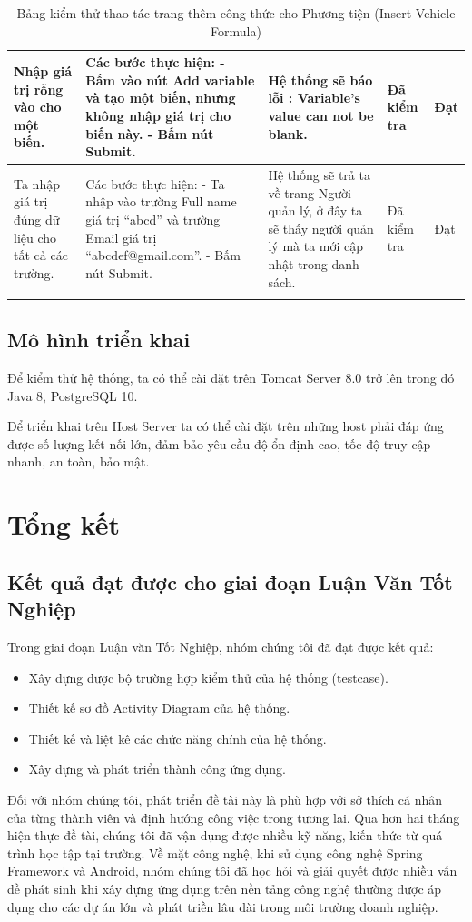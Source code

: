 \documentclass{article}
\begin{document}
\begin{longtable}{ | p{} |p{} | p{}  | p{}  | p{}  | }
\hline
Nhập giá trị rỗng vào cho một biến. &
Các bước thực hiện: \newline
- Bấm vào nút Add variable và tạo một biến, nhưng không nhập giá trị cho biến này. \newline
- Bấm nút Submit.  
&
Hệ thống sẽ báo lỗi : Variable's value can not be blank.
&
Đã kiểm tra &
Đạt \\

\hline
Ta nhập giá trị đúng dữ liệu cho tất cả các trường. &
Các bước thực hiện: \newline
- Ta nhập vào trường Full name giá trị “abcd” và trường Email giá trị “abcdef@gmail.com”. \newline
- Bấm nút Submit.  
&
Hệ thống sẽ trả ta về trang Người quản lý, ở đây ta sẽ thấy người quản lý mà ta mới cập nhật trong danh sách.
&
Đã kiểm tra &
Đạt \\

\hline
\caption{Bảng kiểm thử thao tác trang thêm công thức cho Phương tiện (Insert Vehicle Formula)}
\end{longtable}

\subsection{Mô hình triển khai }
Để kiểm thử hệ thống, ta có thể cài đặt trên Tomcat Server 8.0 trở lên trong đó Java 8, PostgreSQL 10.

Để triển khai trên Host Server ta có thể cài đặt trên những host phải đáp ứng được số lượng kết nối lớn, đảm bảo yêu cầu độ ổn định cao, tốc độ truy cập nhanh, an toàn,
bảo mật.

\section{Tổng kết}
\subsection{Kết quả đạt được cho giai đoạn Luận Văn Tốt Nghiệp}
Trong giai đoạn Luận văn Tốt Nghiệp, nhóm chúng tôi đã đạt được kết quả:
\begin{itemize}
    \item Xây dựng được bộ trường hợp kiểm thử của hệ thống (testcase).
    \item Thiết kế sơ đồ Activity Diagram của hệ thống.
    \item Thiết kế và liệt kê các chức năng chính của hệ thống.
    \item Xây dựng và phát triển thành công ứng dụng.
\end{itemize}
Đối với nhóm chúng tôi, phát triển đề tài này là phù hợp với sở thích cá nhân của từng thành viên và định hướng công việc trong tương lai. Qua hơn hai tháng hiện thực đề tài, chúng tôi đã vận dụng được nhiều kỹ năng, kiến thức từ quá trình học tập tại trường. Về mặt công nghệ, khi sử dụng công nghệ Spring Framework và Android, nhóm chúng tôi đã học hỏi và giải quyết được nhiều vấn đề phát sinh khi xây dựng ứng dụng trên nền tảng công nghệ thường được áp dụng cho các dự án lớn và phát triền lâu dài trong môi trường doanh nghiệp.
\end{document}
